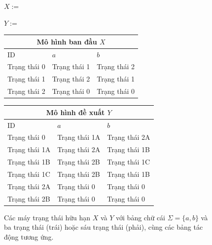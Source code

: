 \clearpage
\begin{figure}[p]\centering
\begin{minipage}[b]{.41\linewidth}\centering$X:=$\par\ctfiveMachineX\end{minipage}\hfill
\begin{minipage}[b]{.55\linewidth}\centering$Y:=$\par\ctfiveMachineY\end{minipage}

\medskip
\begingroup\footnotesize\setlength{\tabcolsep}{3pt}
\begin{tabular}{|l|l|l|}\hline\multicolumn{3}{|c|}{Mô hình ban đầu $X$}\\\hline ID&$a$&$b$\\\hline Trạng thái 0&Trạng thái 1&Trạng thái 2\\Trạng thái 1&Trạng thái 2&Trạng thái 1\\Trạng thái 2&Trạng thái 0&Trạng thái 0\\\hline\end{tabular}\qquad
\begin{tabular}{|l|l|l|}\hline\multicolumn{3}{|c|}{Mô hình đề xuất $Y$}\\\hline ID&$a$&$b$\\\hline Trạng thái 0&Trạng thái 1A&Trạng thái 2A\\Trạng thái 1A&Trạng thái 2A&Trạng thái 1B\\Trạng thái 1B&Trạng thái 2B&Trạng thái 1C\\Trạng thái 1C&Trạng thái 2B&Trạng thái 1B\\Trạng thái 2A&Trạng thái 0&Trạng thái 0\\Trạng thái 2B&Trạng thái 0&Trạng thái 0\\\hline\end{tabular}
\endgroup
\caption{Các máy trạng thái hữu hạn $X$ và $Y$ với bảng chữ cái $\Sigma=\{a,b\}$ và ba trạng thái (trái) hoặc sáu trạng thái (phải), cùng các bảng tác động tương ứng.}\label{fig:ctfive-state-machines}
\par{}
\end{figure}
\clearpage
